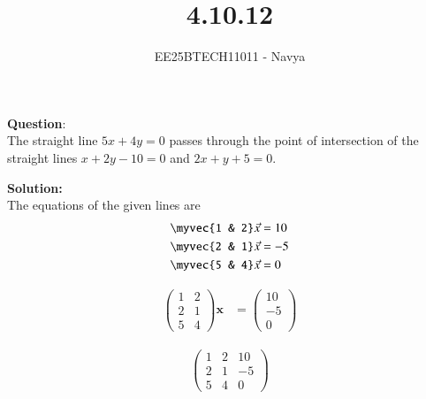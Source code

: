 \documentclass[journal]{IEEEtran}
\begin{document}

\vspace{3cm}

\title{4.10.12}
\author{EE25BTECH11011 - Navya}
{\let\newpage\relax\maketitle}

\renewcommand{\thefigure}{\theenumi}
\renewcommand{\thetable}{\theenumi}
\setlength{\intextsep}{10pt} %
\textbf{Question}:\\
 The straight line $5x+4y=0$ passes through the point of intersection of the straight lines $x+2y-10 = 0$ and $2x+y+5 = 0$.
 
\textbf{Solution:}\\
The equations of the given lines are
\begin{align}
    \myvec{1 & 2}\vec{x} &= 10 \\
    \myvec{2 & 1}\vec{x} &= -5 \\
    \myvec{5 & 4}\vec{x} &= 0 
\end{align}

\begin{align}
\begin{pmatrix}
1 & 2\\
2 & 1\\
5 & 4
\end{pmatrix}
\mathbf{x} &=
\begin{pmatrix}
10\\
-5\\
0
\end{pmatrix}
\end{align}

\begin{align}
\left(\begin{array}{cc|c}
1 & 2 & 10\\
2 & 1 & -5\\
5 & 4 & 0
\end{array}\right)
\end{align}
\end{document}

